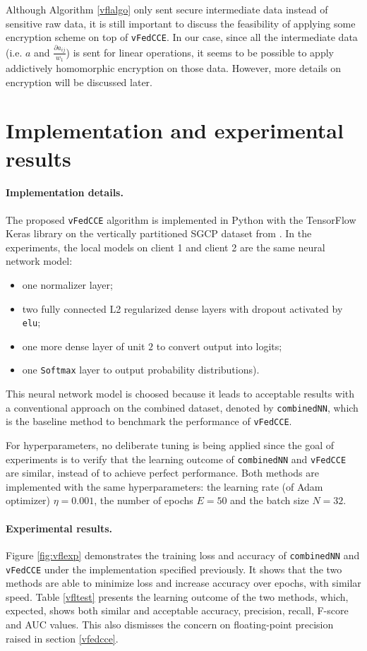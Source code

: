 \documentclass{article}
\begin{document}
Although Algorithm \ref{vflalgo} only sent secure intermediate data instead of sensitive raw data, it is still important to discuss the feasibility of applying some encryption scheme on top of \texttt{vFedCCE}. In our case, since all the intermediate data (i.e. $a$ and $\frac{\partial a_{ij}}{w_1}$) is sent for linear operations, it seems to be possible to apply addictively homomorphic encryption on those data. However, more details on encryption will be discussed later.

\section{Implementation and experimental results}\label{vflexp}
\paragraph{Implementation details.} The proposed \texttt{vFedCCE} algorithm is implemented in Python with the TensorFlow Keras library on the vertically partitioned SGCP dataset from \cite{groemping2019south}. In the experiments, the local models on client 1 and client 2 are the same neural network model:
\begin{itemize}
  \setlength\itemsep{0em}
  \item one normalizer layer;
  \item two fully connected L2 regularized dense layers with dropout activated by \texttt{elu};
  \item one more dense layer of unit $2$ to convert output into logits;
  \item one \texttt{Softmax} layer to output probability distributions).
\end{itemize}
This neural network model is choosed because it leads to acceptable results with a conventional approach on the combined dataset, denoted by \texttt{combinedNN}, which is the baseline method to benchmark the performance of \texttt{vFedCCE}.

For hyperparameters, no deliberate tuning is being applied since the goal of experiments is to verify that the learning outcome of \texttt{combinedNN} and \texttt{vFedCCE} are similar, instead of to achieve perfect performance. Both methods are implemented with the same hyperparameters: the learning rate (of Adam optimizer) $\eta=0.001$, the number of epochs $E=50$ and the batch size $N=32$.

\paragraph{Experimental results.} Figure \ref{fig:vflexp} demonstrates the training loss and accuracy of \texttt{combinedNN} and \texttt{vFedCCE} under the implementation specified previously. It shows that the two methods are able to minimize loss and increase accuracy over epochs, with similar speed. Table \ref{vfltest} presents the learning outcome of the two methods, which, expected, shows both similar and acceptable accuracy, precision, recall, F-score and AUC values. This also dismisses the concern on floating-point precision raised in section \ref{vfedcce}.
\end{document}
